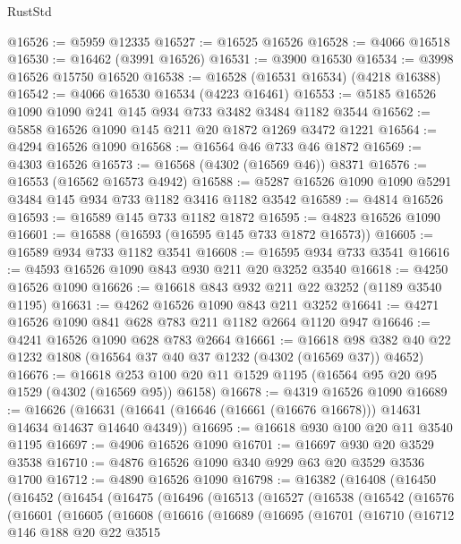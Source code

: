 \begin{lexlean}{RustStd}
\begin{coremodule}
@16526 := @5959 @12335
@16527 := @16525 @16526
@16528 := @4066 @16518
@16530 := @16462 (@3991 @16526)
@16531 := @3900 @16530
@16534 := @3998 @16526 @15750 @16520
@16538 := @16528 (@16531 @16534) (@4218 @16388)
@16542 := @4066 @16530 @16534 (@4223 @16461)
@16553 := @5185 @16526 @1090 @1090 @241 @145 @934 @733 @3482 @3484 @1182 @3544
@16562 := @5858 @16526 @1090 @145 @211 @20 @1872 @1269 @3472 @1221
@16564 := @4294 @16526 @1090
@16568 := @16564 @46 @733 @46 @1872
@16569 := @4303 @16526
@16573 := @16568 (@4302 (@16569 @46)) @8371
@16576 := @16553 (@16562 @16573 @4942)
@16588 := @5287 @16526 @1090 @1090 @5291 @3484 @145 @934 @733 @1182 @3416 @1182 @3542
@16589 := @4814 @16526
@16593 := @16589 @145 @733 @1182 @1872
@16595 := @4823 @16526 @1090
@16601 := @16588 (@16593 (@16595 @145 @733 @1872 @16573))
@16605 := @16589 @934 @733 @1182 @3541
@16608 := @16595 @934 @733 @3541
@16616 := @4593 @16526 @1090 @843 @930 @211 @20 @3252 @3540
@16618 := @4250 @16526 @1090
@16626 := @16618 @843 @932 @211 @22 @3252 (@1189 @3540 @1195)
@16631 := @4262 @16526 @1090 @843 @211 @3252
@16641 := @4271 @16526 @1090 @841 @628 @783 @211 @1182 @2664 @1120 @947
@16646 := @4241 @16526 @1090 @628 @783 @2664
@16661 := @16618 @98 @382 @40 @22 @1232 @1808 (@16564 @37 @40 @37 @1232 (@4302 (@16569 @37)) @4652)
@16676 := @16618 @253 @100 @20 @11 @1529 @1195 (@16564 @95 @20 @95 @1529 (@4302 (@16569 @95)) @6158)
@16678 := @4319 @16526 @1090
@16689 := @16626
    (@16631 (@16641 (@16646 (@16661 (@16676 @16678))) @14631 @14634 @14637 @14640 @4349))
@16695 := @16618 @930 @100 @20 @11 @3540 @1195
@16697 := @4906 @16526 @1090
@16701 := @16697 @930 @20 @3529 @3538
@16710 := @4876 @16526 @1090 @340 @929 @63 @20 @3529 @3536 @1700
@16712 := @4890 @16526 @1090
@16798 := @16382
    (@16408
      (@16450
        (@16452
          (@16454
            (@16475
              (@16496
                (@16513
                  (@16527
                    (@16538
                      (@16542
                        (@16576
                          (@16601
                            (@16605
                              (@16608
                                (@16616
                                  (@16689
                                    (@16695
                                      (@16701
                                        (@16710
                                          (@16712
                                            @146
                                            @188
                                            @20
                                            @22
                                            @3515

\end{coremodule}
\end{lexlean}
